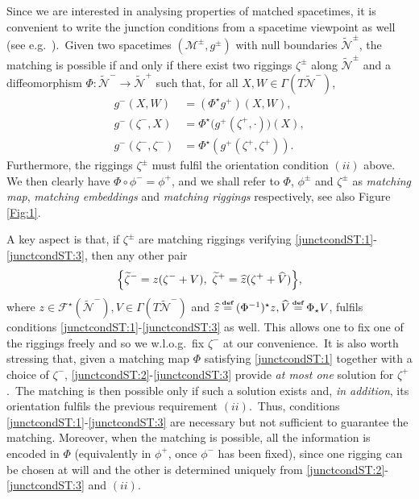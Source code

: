 \documentclass[11pt]{article}
\numberwithin{equation}{section}
\def\defi{{\stackrel{\mbox{\tiny {\textbf{def}}}}{\,\, = \,\, }}}
\def\Fcal{\mathcal F}
\newcommand{\nn}{\nonumber}
\newcommand\N{\mathcal N}
\newcommand\rig{\zeta}
\def\defi{{\stackrel{\mbox{\tiny \textup{\textbf{def}}}}{\,\, = \,\, }}}
\def\Fcal{\mathcal F}
\newcommand{\Mpm}{\mathcal{M}^{\pm}}
\newcommand{\wt}{\widetilde}
\newcommand{\nullhyp}{\widetilde{\N}}
\newcommand{\spc}{\textup{ }}
\begin{document}
Since we are interested in analysing properties of matched spacetimes, it is convenient to write the junction conditions from a spacetime viewpoint as well (see e.g.\ \cite{mars1993geometry}).\ Given two spacetimes $(\Mpm, g^{\pm})$ with null boundaries $\nullhyp^{\pm}$, the matching is possible if and only if there exist two riggings $\rig^{\pm}$ along $\nullhyp^{\pm}$ and a diffeomorphism ${\Phi}:\nullhyp^- \longrightarrow \nullhyp^+$ such that, for all $X,W\in\Gamma(T\nullhyp^-)$,
\begin{align} 
\label{junctcondST:1} g^-(X,W)&=({\Phi}^{\star}g^+)(X,W),\\ 
\label{junctcondST:2} g^-(\rig^-,X)&={\Phi}^{\star}\big(g^+(\rig^+,\cdot)\big) (X),\\ 
\label{junctcondST:3} g^-(\rig^-,\rig^-)&={\Phi}^{\star}(g^+(\rig^+,\rig^+)).
\end{align}
Furthermore, the riggings $\rig^{\pm}$ must fulfil
the orientation condition \hyperlink{junc-cond-FHD}{$(ii)$} above. We then clearly have $\Phi \circ \phi^- = \phi^+$, and we shall refer to $\Phi$, $\phi^{\pm}$ and $\rig^{\pm}$ as \textit{matching map}, \textit{matching embeddings} and \textit{matching riggings} respectively, see also Figure \ref{Fig:1}. 

A key aspect is that, 
if $\rig^{\pm}$ are matching riggings verifying \eqref{junctcondST:1}-\eqref{junctcondST:3}, then any other pair 
\begin{equation}
\nn \Bigl\{\wt{\rig}^-=z(\rig^-+V),\spc\wt{\rig}^+=\widehat{z}(\rig^++\widehat{V})\Bigr\},
\end{equation}
where $ z\in\Fcal^{\star}(\nullhyp^-), V\in\Gamma(T\nullhyp^-)$ and $\widehat{z}\defi ({\Phi}^{-1})^{\star}z,\widehat{V}\defi {\Phi}_{\star}V$, 
fulfils conditions \eqref{junctcondST:1}-\eqref{junctcondST:3} as well. 
This allows one to fix one of the riggings freely and so we w.l.o.g.\ fix $\rig^-$ at our convenience.\ It is also worth stressing that, given a matching map $\Phi$ satisfying \eqref{junctcondST:1} together with a choice of $\rig^-$, \eqref{junctcondST:2}-\eqref{junctcondST:3} provide \textit{at most one} solution for $\rig^+$  \cite[Lem.\ 3]{mars2007lorentzian}.\ The matching is then possible only if such a solution exists and, \textit{in addition}, its orientation fulfils the previous requirement \hyperlink{junc-cond-FHD}{$(ii)$}.\  Thus, 
conditions \eqref{junctcondST:1}-\eqref{junctcondST:3} are necessary but not sufficient to guarantee the matching. Moreover, when the matching is possible, all the information is encoded in $\Phi$ (equivalently in $\phi^+$, once $\phi^-$ has been fixed), since one rigging can be chosen at will and the other is determined uniquely from \eqref{junctcondST:2}-\eqref{junctcondST:3} and \hyperlink{junc-cond-FHD}{$(ii)$}.\ 
\end{document}
